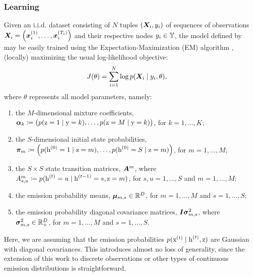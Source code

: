 \subsubsection{Learning}
\label{sec:learning}
Given an i.i.d. dataset consisting of $N$ tuples $({\bm{X}}_i, y_i)$ of sequences of observations ${\bm{X}}_i = \left({\bm{x}}_i^{(1)}, \dots,{\bm{x}}_i^{(T_i)} \right)$ and their respective nodes $y_i \in {\mathbb{Y}}$, the model defined by  may be easily trained using the Expectation-Maximization (EM) algorithm \citet{Dempster1977}, (locally) maximizing the usual log-likelihood objective:
\begin{equation}
\label{log_likelihood}
J(\theta) = \sum_{i=1}^N \log p({\bm{X}}_i \mid y_i, \theta),
\end{equation}
where $\theta$ represents all model parameters, namely:
\begin{enumerate}
	\item the $M$-dimensional mixture coefficients, ${\bm{\alpha}}_k \coloneqq \left(p({\textnormal{z}}=1\mid{\textnormal{y}}=k), \dots, p({\textnormal{z}}=M\mid{\textnormal{y}}=k)\right)$, for $k = 1,\dots,K$;
	\item the $S$-dimensional initial state probabilities, ${\bm{\pi}}_m \coloneqq \left(p({\textnormal{h}}^{(0)}=1 \mid {\textnormal{z}}=m),\dots,p({\textnormal{h}}^{(0)}=S \mid {\textnormal{z}}=m)\right)$, for $m = 1,\dots,M$;
	\item the $S \times S$ state transition matrices, ${\bm{A}}^m$, where ${A}^m_{s,u} \coloneqq p({\textnormal{h}}^{(t)}=u \mid {\textnormal{h}}^{(t-1)}=s, {\textnormal{z}}=m)$, for $s,u = 1,\dots,S$ and $m = 1,\dots,M$;
	\item the emission probability means, ${\bm{\mu}}_{m,s} \in \mathbb{R}^D$, for $m = 1,\dots,M$ and $s = 1,\dots,S$;
	\item the emission probability diagonal covariance matrices, ${\bm{I}} {\bm{\sigma}}^2_{m,s}$, where ${\bm{\sigma}}^2_{m,s} \in \mathbb{R}^{D}_{+}$, for $m = 1,\dots,M$ and $s = 1,\dots,S$.
\end{enumerate}

Here, we are assuming that the emission probabilities $p({\textnormal{x}}^{(t)}\mid{\textnormal{h}}^{(t)},{\textnormal{z}})$ are Gaussian with diagonal covariances. This introduces almost no loss of generality, since the extension of this work to discrete observations or other types of continuous emission distributions is straightforward.

